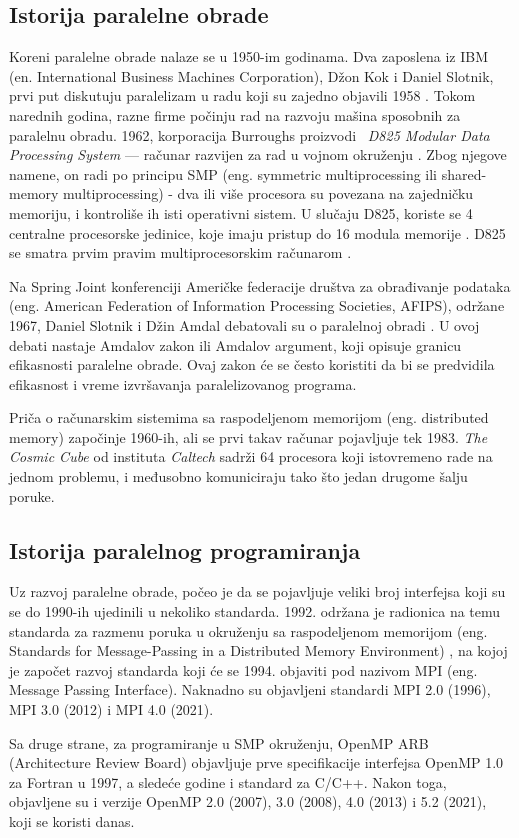 \documentclass[a4paper]{article}
\begin{document}
	\subsection{Istorija paralelne obrade}
	Koreni paralelne obrade nalaze se u 1950-im godinama. Dva zaposlena iz IBM (en. International Business Machines Corporation), Džon Kok i Daniel Slotnik, prvi put diskutuju paralelizam u radu koji su zajedno objavili 1958 \cite{historyofdevelopment}. Tokom narednih godina, razne firme počinju rad na razvoju mašina sposobnih za paralelnu obradu. 1962, korporacija Burroughs proizvodi ~{\em D825 Modular Data Processing System} — računar razvijen za rad u vojnom okruženju \cite{d825}. Zbog njegove namene, on radi po principu SMP (eng. symmetric multiprocessing ili shared-memory multiprocessing) - dva ili više procesora su povezana na zajedničku memoriju, i kontroliše ih isti operativni sistem. U slučaju D825, koriste se 4 centralne procesorske jedinice, koje imaju pristup do 16 modula memorije \cite{d825}. D825 se smatra prvim pravim multiprocesorskim računarom \cite{multiprocessororganizationsurvey}.\par
	Na Spring Joint konferenciji Američke federacije društva za obrađivanje podataka (eng. American Federation of Information Processing Societies, AFIPS), održane 1967, Daniel Slotnik i Džin Amdal debatovali su o paralelnoj obradi \cite{springjoint}. U ovoj debati nastaje Amdalov zakon ili Amdalov argument, koji opisuje granicu efikasnosti paralelne obrade. Ovaj zakon će se često koristiti da bi se predvidila efikasnost i vreme izvršavanja paralelizovanog programa.\par
	Priča o računarskim sistemima sa raspodeljenom memorijom  (eng. distributed memory) započinje 1960-ih, ali se prvi takav računar pojavljuje tek 1983\cite{hypercube}. \emph{The Cosmic Cube} od instituta \emph{Caltech} sadrži 64 procesora koji istovremeno rade na jednom problemu, i međusobno komuniciraju tako što jedan drugome šalju poruke\cite{thecosmiccube}.
	\subsection{Istorija paralelnog programiranja}
	Uz razvoj paralelne obrade, počeo je da se pojavljuje veliki broj interfejsa koji su se do 1990-ih ujedinili u nekoliko standarda. 1992. održana je radionica na temu standarda za razmenu poruka u okruženju sa raspodeljenom memorijom (eng. Standards for Message-Passing in a Distributed Memory Environment) \cite{standardsformessagepassing}, na kojoj je započet razvoj standarda koji će se 1994. objaviti pod nazivom MPI (eng. Message Passing Interface). Naknadno su objavljeni standardi MPI 2.0 (1996), MPI 3.0 (2012) i MPI 4.0 (2021)\cite{mpidocs}.\par
	Sa druge strane, za programiranje u SMP okruženju, OpenMP ARB (Architecture Review Board) objavljuje prve specifikacije interfejsa OpenMP 1.0 za Fortran u 1997, a sledeće godine i standard za C/C++. Nakon toga, objavljene su i verzije OpenMP 2.0 (2007), 3.0 (2008), 4.0 (2013) i 5.2 (2021), koji se koristi danas\cite{opemp5}.
	
\end{document}
